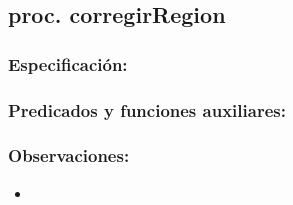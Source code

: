 \subsection{proc. corregirRegion}
    \subsubsection{Especificaci\'on:}    
    \subsubsection{Predicados y funciones auxiliares:}
    \subsubsection{Observaciones:}
        \begin{itemize}
            \item
        \end{itemize}